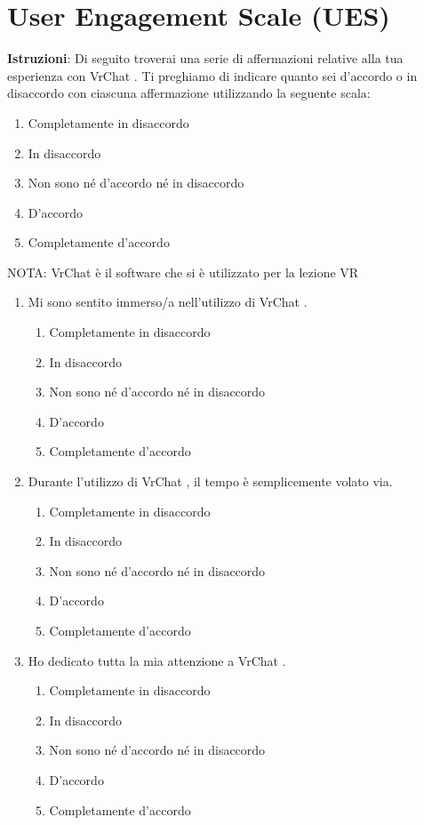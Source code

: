 \documentclass{article}
\newcommand{\app}{VrChat \hspace{0.1em}}
\begin{document}
\section*{User Engagement Scale (UES)}

\noindent \textbf{Istruzioni}: Di seguito troverai una serie di affermazioni relative alla tua esperienza con \app. Ti preghiamo di indicare quanto sei d'accordo o in disaccordo con ciascuna affermazione utilizzando la seguente scala:

\begin{enumerate}
    \item Completamente in disaccordo
    \item In disaccordo
    \item Non sono né d’accordo né in disaccordo
    \item D’accordo
    \item Completamente d’accordo
\end{enumerate}

\noindent NOTA: VrChat è il software che si è utilizzato per la lezione VR


\begin{enumerate}[label=\textbf{Domanda \arabic*.}]
    \item Mi sono sentito immerso/a nell'utilizzo di \app.
    \begin{enumerate}
    \item Completamente in disaccordo
    \item In disaccordo
    \item Non sono né d’accordo né in disaccordo
    \item D’accordo
    \item Completamente d’accordo
\end{enumerate}
    \item Durante l'utilizzo di \app, il tempo è semplicemente volato via.
    \begin{enumerate}
    \item Completamente in disaccordo
    \item In disaccordo
    \item Non sono né d’accordo né in disaccordo
    \item D’accordo
    \item Completamente d’accordo
\end{enumerate}
    \item Ho dedicato tutta la mia attenzione a \app.
    \begin{enumerate}
    \item Completamente in disaccordo
    \item In disaccordo
    \item Non sono né d’accordo né in disaccordo
    \item D’accordo
    \item Completamente d’accordo
\end{enumerate}
\end{enumerate}
\end{document}
